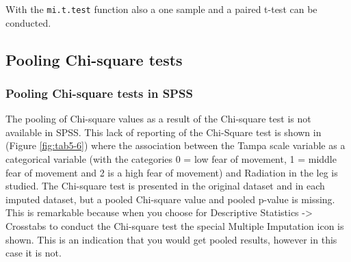 \documentclass[
]{book}
\begin{document}
With the \texttt{mi.t.test} function also a one sample and a paired t-test can be conducted.

\hypertarget{pooling-chi-square-tests}{%
\subsection{Pooling Chi-square tests}\label{pooling-chi-square-tests}}

\hypertarget{pooling-chi-square-tests-in-spss}{%
\subsubsection{Pooling Chi-square tests in SPSS}\label{pooling-chi-square-tests-in-spss}}

The pooling of Chi-square values as a result of the Chi-square test is not available in SPSS. This lack of reporting of the Chi-Square test is shown in (Figure \ref{fig:tab5-6}) where the association between the Tampa scale variable as a categorical variable (with the categories 0 = low fear of movement, 1 = middle fear of movement and 2 is a high fear of movement) and Radiation in the leg is studied. The Chi-square test is presented in the original dataset and in each imputed dataset, but a pooled Chi-square value and pooled p-value is missing. This is remarkable because when you choose for Descriptive Statistics -\textgreater{} Crosstabs to conduct the Chi-square test the special Multiple Imputation icon is shown. This is an indication that you would get pooled results, however in this case it is not.
\end{document}
